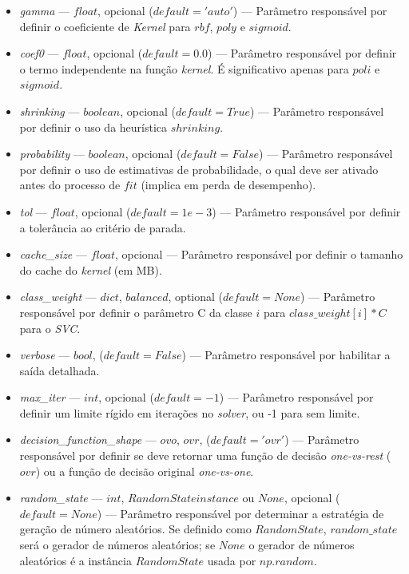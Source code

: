 \documentclass[
	12pt,				%
	oneside,			%
	a4paper,			%
	english,			%
	brazil				%
	]{abntex2ppgsi}
\begin{document}
{{{\begin{apendicesenv}
\begin{itemize}
\item \textit{gamma} --- $float$, opcional ($default='auto'$) --- Parâmetro responsável por definir o coeficiente de \textit{Kernel} para $rbf$, $poly$ e $sigmoid$.

\item \textit{coef0} --- $float$, opcional ($default=0.0$) --- Parâmetro responsável por definir o termo independente na função \textit{kernel}. É significativo apenas para $poli$ e $sigmoid$.

\item \textit{shrinking} --- $boolean$, opcional ($default=True$) --- Parâmetro responsável por definir o uso da heurística $shrinking$.

\item \textit{probability} --- $boolean$, opcional ($default=False$) --- Parâmetro responsável por definir o uso de estimativas de probabilidade, o qual deve ser ativado antes do processo de $fit$ (implica em perda de desempenho).

\item \textit{tol} --- $float$, opcional ($default=1e-3$) --- Parâmetro responsável por definir a tolerância ao critério de parada.

\item \textit{cache\_size} --- $float$, opcional --- Parâmetro responsável por definir o tamanho do cache do \textit{kernel} (em MB).

\item \textit{class\_weight} --- $dict$, $balanced$, optional ($default = None$) --- Parâmetro responsável  por definir o parâmetro C da classe $i$ para $class\_weight[i]*C$ para o \textit{SVC}.

\item \textit{verbose} --- $bool$, ($default = False$) --- Parâmetro responsável por habilitar a saída detalhada.

\item \textit{max\_iter} --- $int$, opcional ($default=-1$) --- Parâmetro responsável por definir um limite rígido em iterações no \textit{solver}, ou -1 para sem limite.

\item \textit{decision\_function\_shape} --- $ovo$, $ovr$, ($default='ovr'$) --- Parâmetro responsável por definir se deve retornar uma função de decisão \textit{one-vs-rest} ($ovr$) ou a função de decisão original \textit{one-vs-one}.

\item \textit{random\_state} --- $int$, $RandomState instance$ ou $None$, opcional ($default=None$) --- Parâmetro responsável por determinar a estratégia de geração de número aleatórios. Se definido como $RandomState$, $random\_state$ será o gerador de números aleatórios; se $None$ o gerador de números aleatórios é a instância $RandomState$ usada por $np.random$.


\end{itemize}
\end{apendicesenv}}}}
\end{document}
